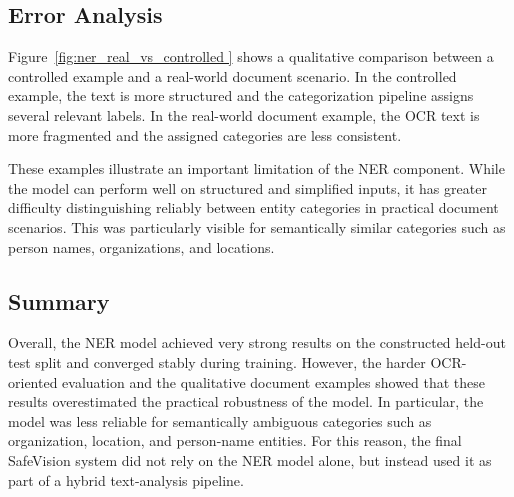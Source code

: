 \subsection{Error Analysis}

Figure~\ref{fig:ner_real_vs_controlled } shows a qualitative comparison
between a controlled example and a real-world document scenario. In the
controlled example, the text is more structured and the categorization pipeline
assigns several relevant labels. In the real-world document example, the OCR
text is more fragmented and the assigned categories are less consistent.

These examples illustrate an important limitation of the NER component. While
the model can perform well on structured and simplified inputs, it has greater
difficulty distinguishing reliably between entity categories in practical
document scenarios. This was particularly visible for semantically similar
categories such as person names, organizations, and locations.

\subsection{Summary}

Overall, the NER model achieved very strong results on the constructed held-out
test split and converged stably during training. However, the harder OCR-oriented
evaluation and the qualitative document examples showed that these results
overestimated the practical robustness of the model. In particular, the model
was less reliable for semantically ambiguous categories such as organization,
location, and person-name entities. For this reason, the final SafeVision system
did not rely on the NER model alone, but instead used it as part of a hybrid
text-analysis pipeline.